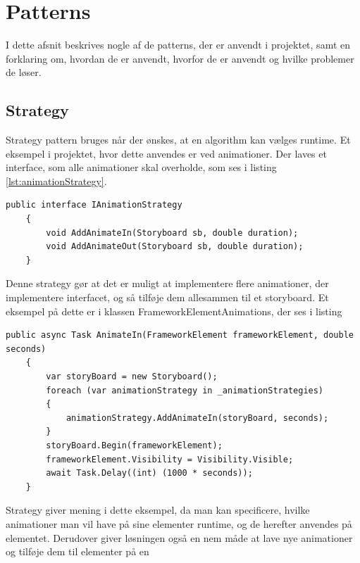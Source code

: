 \documentclass[Implementering/Implementering_main.tex]{subfiles}
\begin{document}
\section{Patterns}
I dette afsnit beskrives nogle af de patterns, der er anvendt i projektet, samt en forklaring om, hvordan de er anvendt, hvorfor de er anvendt og hvilke problemer de løser.
\subsection{Strategy}
Strategy pattern bruges når der ønskes, at en algorithm kan vælges runtime. Et eksempel i projektet, hvor dette anvendes er ved animationer. Der laves et interface, som alle animationer skal overholde, som ses i listing \ref{lst:animationStrategy}.
\begin{lstlisting}[caption={Interface for AnimationStrategy}, label={lst:animationStrategy},
style=customc]
    public interface IAnimationStrategy
    {
        void AddAnimateIn(Storyboard sb, double duration);
        void AddAnimateOut(Storyboard sb, double duration);
    }
\end{lstlisting}
Denne strategy gør at det er muligt at implementere flere animationer, der implementere interfacet, og så tilføje dem allesammen til et storyboard. Et eksempel på dette er i klassen FrameworkElementAnimations, der ses i listing


\begin{lstlisting}[caption={FrameworkElementAnimation AnimateIn funktion}, label={lst:animationStrategy},
style=customc]
    public async Task AnimateIn(FrameworkElement frameworkElement, double seconds)
    {
        var storyBoard = new Storyboard();
        foreach (var animationStrategy in _animationStrategies)
        {
            animationStrategy.AddAnimateIn(storyBoard, seconds);
        }
        storyBoard.Begin(frameworkElement);
        frameworkElement.Visibility = Visibility.Visible;
        await Task.Delay((int) (1000 * seconds));
    }
\end{lstlisting}

Strategy giver mening i dette eksempel, da man kan specificere, hvilke animationer man vil have på sine elementer runtime, og de herefter anvendes på elementet. Derudover giver løsningen også en nem måde at lave nye animationer og tilføje dem til elementer på en
\end{document}
